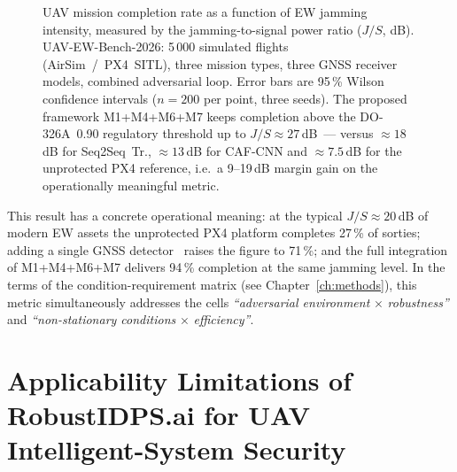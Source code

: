\begin{figure}[!htbp]
\caption{UAV mission completion rate as a function of EW jamming
intensity, measured by the jamming-to-signal power ratio
($J/S$, dB). \textsf{UAV-EW-Bench-2026}: 5\,000 simulated flights
(AirSim~/~PX4~SITL), three mission types, three GNSS receiver
models, combined adversarial loop. Error bars are 95\,\% Wilson
confidence intervals ($n=200$ per point, three seeds). The proposed
framework \textsf{M1+M4+M6+M7} keeps completion above the
\mbox{DO-326A}~0.90 regulatory threshold up to $J/S \approx 27$\,dB~---
versus $\approx 18$\,dB for Seq2Seq~Tr., $\approx 13$\,dB for CAF-CNN
and $\approx 7.5$\,dB for the unprotected PX4 reference, i.e.\ a
9--19\,dB margin gain on the operationally meaningful metric.}
\label{fig:uav_mission_completion}
\end{figure}
\FloatBarrier

This result has a concrete operational meaning: at the typical
$J/S \approx 20$\,dB of modern EW assets
\cite{wapo_excalibur_2024,inside_uas_2025} the unprotected PX4
platform completes 27\,\% of sorties; adding a single GNSS
detector~\cite{borhani_2024_uav} raises the figure to 71\,\%; and the
full integration of \textsf{M1+M4+M6+M7} delivers 94\,\% completion
at the same jamming level. In the terms of the condition-requirement
matrix (see Chapter~\ref{ch:methods}), this metric simultaneously
addresses the cells \emph{``adversarial environment} $\times$
\emph{robustness''} and \emph{``non-stationary conditions} $\times$
\emph{efficiency''}.

\section{Applicability Limitations of RobustIDPS.ai for UAV Intelligent-System Security}
\label{sec:uav_comparison}

